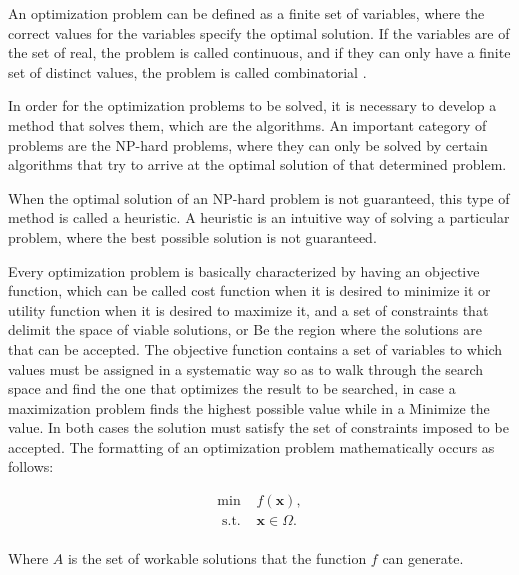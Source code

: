 \documentclass[conference,harvard,brazil,english]{sbatex}
\begin{document}
	An optimization problem can be defined as a finite set of variables, where the correct values for the variables specify the optimal solution. If the variables are of the set of real, the problem is called continuous, and if they can only have a finite set of distinct values, the problem is called combinatorial \protect\cite{francq2011optimization}.
	
	In order for the optimization problems to be solved, it is necessary to develop a method that solves them, which are the algorithms. An important category of problems are the NP-hard problems, where they can only be solved by certain algorithms that try to arrive at the optimal solution of that determined problem.
	
	When the optimal solution of an NP-hard problem is not guaranteed, this type of method is called a heuristic. A heuristic is an intuitive way of solving a particular problem, where the best possible solution is not guaranteed.
	
	Every optimization problem is basically characterized by having an objective function, which can be called cost function when it is desired to minimize it or utility function when it is desired to maximize it, and a set of constraints that delimit the space of viable solutions, or Be the region where the solutions are that can be accepted. The objective function contains a set of variables to which values must be assigned in a systematic way so as to walk through the search space and find the one that optimizes the result to be searched, in case a maximization problem finds the highest possible value while in a Minimize the value. In both cases the solution must satisfy the set of constraints imposed to be accepted. The formatting of an optimization problem mathematically occurs as follows:

	\begin{equation}
		\label{eq:optproblem}
		\begin{array}{cc}
		\min & f(\textbf{x}),  \\
		\textrm{ s.t. } & \textbf{x}\in\Omega.\\
		\end{array}
	\end{equation}	
	
	
	Where \(A\) is the set of workable solutions that the function \(f\) can generate.
	
\end{document}
